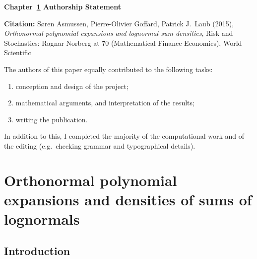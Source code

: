 \vspace*{\fill}

{\large \bf Chapter~\ref{chp:sln_orth_pdf} Authorship Statement}

\vspace{1em}

{\bf Citation:} S{\o}ren Asmussen, Pierre-Olivier Goffard, Patrick J.\ Laub (2015), \emph{Orthonormal polynomial expansions and lognormal sum densities}, Risk and Stochastics: Ragnar Norberg at 70 (Mathematical Finance Economics), World Scientific

\vspace{1em}

The authors of this paper equally contributed to the following tasks:
\begin{enumerate}
\item conception and design of the project;
\item mathematical arguments, and interpretation of the results;
\item writing the publication.
\end{enumerate}

In addition to this, I completed the majority of the computational work and of the editing (e.g.\ checking grammar and typographical details).

\vspace{3em}

\vspace*{\fill}

\chapter{Orthonormal polynomial expansions and densities of sums of lognormals} \label{chp:sln_orth_pdf}

\section{Introduction}\label{S:SLN_Ortho_PDF_Intr}

